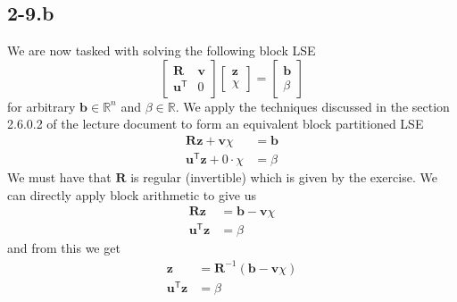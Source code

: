 \documentclass{article}
\begin{document}
\subsection*{2-9.b}
We are now tasked with solving the following block LSE
\begin{equation*}
    \begin{bmatrix}
        \mathbf{R} & \mathbf{v} \\
        \mathbf{u}^{\mathsf{T}} & 0
    \end{bmatrix}
    \begin{bmatrix}
        \mathbf{z} \\
        \chi
    \end{bmatrix}
    = \begin{bmatrix}
        \mathbf{b}\\
        \beta
    \end{bmatrix}
\end{equation*}
for arbitrary $\mathbf{b}\in \mathbb{R}^{n}$ and $\beta \in \mathbb{R}$. We apply the techniques discussed in the section 2.6.0.2 of the lecture document to form an equivalent block partitioned LSE
\begin{align*}
    \mathbf{R}\mathbf{z} + \mathbf{v}\chi &= \mathbf{b} \\
    \mathbf{u}^{\mathsf{T}}\mathbf{z} + 0 \cdot \chi &= \beta
\end{align*}
We must have that $\mathbf{R}$ is regular (invertible) which is given by the exercise. We can directly apply block arithmetic to give us
\begin{align*}
    \mathbf{R}\mathbf{z}  &= \mathbf{b} - \mathbf{v}\chi\\
    \mathbf{u}^{\mathsf{T}}\mathbf{z} &= \beta
\end{align*}
and from this we get
\begin{align*}
    \mathbf{z}  &= \mathbf{R}^{-1}\left(\mathbf{b} - \mathbf{v}\chi\right)\\
    \mathbf{u}^{\mathsf{T}}\mathbf{z} &= \beta
\end{align*}

\pagebreak
\end{document}
